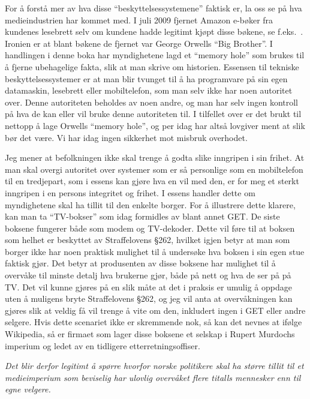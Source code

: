 \documentclass[11pt,norsk,a4paper]{article}
\begin{document}
For å forstå mer av hva disse ``beskyttelsessystemene'' faktisk er, la
oss se på hva medieindustrien har kommet med.  I juli 2009 fjernet
Amazon e-bøker fra kundenes lesebrett selv om kundene hadde legitimt
kjøpt disse bøkene, se f.eks.~\cite{nytamazon}. Ironien er at blant
bøkene de fjernet var George Orwells ``Big Brother''. I handlingen i
denne boka har myndighetene lagd et ``memory hole'' som brukes til å
fjerne ubehagelige fakta, slik at man skrive om historien. Essensen
til tekniske beskyttelsessystemer er at man blir tvunget til å ha
programvare på sin egen datamaskin, lesebrett eller mobiltelefon, som
man selv ikke har noen autoritet over. Denne autoriteten beholdes av
noen andre, og man har selv ingen kontroll på hva de kan eller vil
bruke denne autoriteten til. I tilfellet over er det brukt til nettopp
å lage Orwells ``memory hole'', og per idag har altså lovgiver ment at
slik bør det være. Vi har idag ingen sikkerhet mot misbruk overhodet.

Jeg mener at befolkningen ikke skal trenge å godta slike inngripen i
sin frihet. At man skal overgi autoritet over systemer som er så
personlige som en mobiltelefon til en tredjepart, som i essens kan
gjøre hva en vil med den, er for meg et sterkt inngripen i en persons
integritet og frihet. I essens handler dette om myndighetene skal ha
tillit til den enkelte borger. For å illustrere dette klarere, kan man
ta ``TV-bokser'' som idag formidles av blant annet GET. De siste
boksene fungerer både som modem og TV-dekoder. Dette vil føre til at
boksen som helhet er beskyttet av Straffelovens §262, hvilket igjen
betyr at man som borger ikke har noen praktisk mulighet til å
undersøke hva boksen i sin egen stue faktisk gjør. Det betyr at
produsenten av disse boksene har mulighet til å overvåke til minste
detalj hva brukerne gjør, både på nett og hva de ser på på TV. Det vil
kunne gjøres på en slik måte at det i praksis er umulig å oppdage uten
å muligens bryte Straffelovens §262, og jeg vil anta at overvåkningen
kan gjøres slik at veldig få vil trenge å vite om den, inkludert ingen
i GET eller andre selgere. Hvis dette scenariet ikke er skremmende
nok, så kan det nevnes at ifølge Wikipedia\cite{ndswiki}, så er firmaet som lager
disse boksene et selskap i Rupert Murdochs imperium og ledet av en
tidligere etterretningsoffiser.

\emph{Det blir derfor legitimt å spørre hvorfor norske politikere skal ha
større tillit til et medieimperium som beviselig har ulovlig overvåket
flere titalls mennesker\cite{newscorpphone} enn til egne velgere.} 
\end{document}
